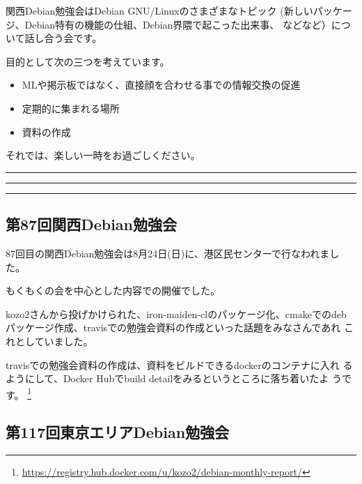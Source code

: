 \documentclass[mingoth,a4paper]{jsarticle}
\begin{document}
 関西Debian勉強会はDebian GNU/Linuxのさまざまなトピック
 (新しいパッケージ、Debian特有の機能の仕組、Debian界隈で起こった出来事、
 などなど）について話し合う会です。

 目的として次の三つを考えています。
 \begin{itemize}
  \item MLや掲示板ではなく、直接顔を合わせる事での情報交換の促進
  \item 定期的に集まれる場所
  \item 資料の作成
 \end{itemize}

 それでは、楽しい一時をお過ごしください。

\newpage

\begin{minipage}[b]{0.2\hsize}
 {}
\end{minipage}
\begin{minipage}[b]{0.8\hsize}
\hrule
\vspace{2mm}
\hrule
\setcounter{tocdepth}{1}
\tableofcontents
\vspace{2mm}
\hrule
\end{minipage}


\subsection{第87回関西Debian勉強会}

87回目の関西Debian勉強会は8月24日(日)に、港区民センターで行なわれました。

もくもくの会を中心とした内容での開催でした。

kozo2さんから投げかけられた、iron-maiden-clのパッケージ化、cmakeでのdeb
パッケージ作成、travisでの勉強会資料の作成といった話題をみなさんであれ
これとしていました。

travisでの勉強会資料の作成は、資料をビルドできるdockerのコンテナに入れ
るようにして、Docker Hubでbuild detailをみるというところに落ち着いたよ
うです。
\footnote{\url{https://registry.hub.docker.com/u/kozo2/debian-monthly-report/}}


\subsection{第117回東京エリアDebian勉強会}
\end{document}
